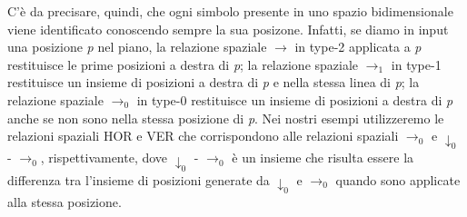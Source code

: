 C'è da precisare, quindi, che ogni simbolo presente in uno spazio bidimensionale viene identificato conoscendo sempre la sua posizone. Infatti, se diamo in input una posizione \textit{p} nel piano, la relazione spaziale $\to$ in type-2 applicata a \textit{p} restituisce le prime posizioni a destra di \textit{p}; la relazione spaziale $\to_1$ in type-1 restituisce un insieme di posizioni a destra di \textit{p} e nella stessa linea di \textit{p}; la relazione spaziale $\to_0$ in type-0 restituisce un insieme di posizioni a destra di \textit{p} anche se non sono nella stessa posizione di \textit{p}.
Nei nostri esempi utilizzeremo le relazioni spaziali HOR e VER che corrispondono alle relazioni spaziali $\to_0$ e $\downarrow_0$ - $\to_0$, rispettivamente, dove $\downarrow_0$ - $\to_0$ è un insieme che risulta essere la differenza tra l'insieme di posizioni generate da $\downarrow_0$ e $\to_0$ quando sono applicate alla stessa posizione. 
